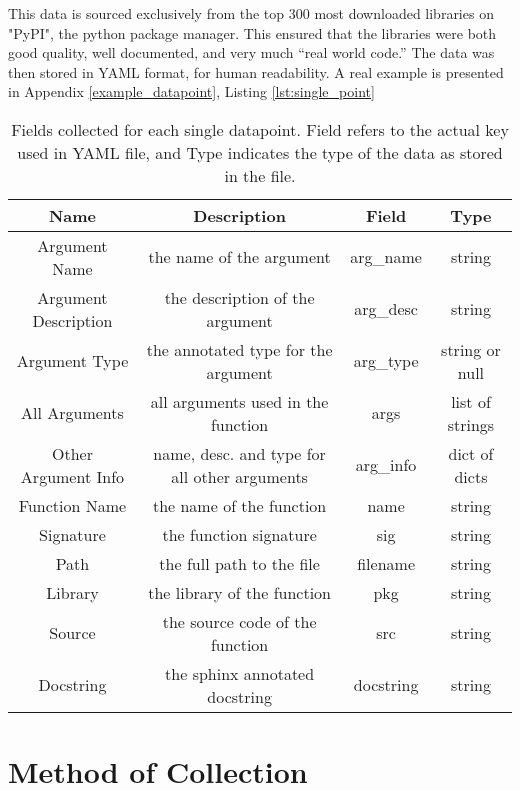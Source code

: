 This data is sourced exclusively from the top 300 most downloaded libraries on "PyPI", the python package manager. 
This ensured that the libraries were both good quality, well documented, and very much ``real world code.''
The data was then stored in YAML format, for human readability. 
A real example is presented in Appendix \ref{example_datapoint}, Listing \ref{lst:single_point}


\begin{table}[h!]
    \begin{center}
    \begin{tabular}{| c | c | c | c |}
    \hline
        Name &  Description     &    Field    & Type  \\
    \hline
        Argument Name & the name of the argument  & arg\_name & string \\
        Argument Description & the description of the argument & arg\_desc & string \\
        Argument Type & the annotated type for the argument & arg\_type & string or null \\
        All Arguments & all arguments used in the function & args & list of strings \\
        Other Argument Info & name, desc. and type for all other arguments & arg\_info & dict of dicts\\
        Function Name & the name of the function & name & string\\
        Signature & the function signature & sig & string\\
        Path & the full path to the file & filename & string \\
        Library & the library of the function & pkg & string\\
        Source & the source code of the function & src & string\\
        Docstring & the sphinx annotated docstring & docstring & string\\

    \hline


    \end{tabular}
    \caption {Fields collected for each single datapoint. Field refers to the actual key used in YAML file, and Type indicates the type of the data as stored in the file.}
    \label{table:metadata}
    \end{center}
\end{table}



\section{Method of Collection} %
\label{sec:method_of_collection}


